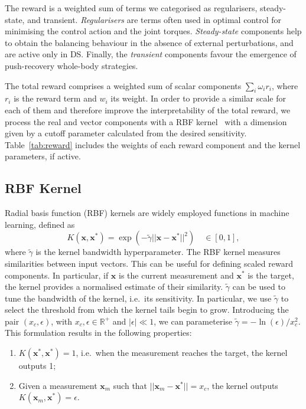 The reward is a weighted sum of terms we categorised as regularisers, steady-state, and transient.
\emph{Regularisers} are terms often used in optimal control for minimising the control action and the joint torques.
\emph{Steady-state} components help to obtain the balancing behaviour in the absence of external perturbations, and are active only in \ac{DS}.
Finally, the \emph{transient} components favour the emergence of push-recovery whole-body strategies.

The total reward comprises a weighted sum of scalar components $\sum_i \omega_i r_i$, where $r_i$ is the reward term and $w_i$ its weight.
In order to provide a similar scale for each of them and therefore improve the interpretability of the total reward, we process the real and vector components with a \ac{RBF} kernel~\parencite{yang_emergence_2017} with a dimension given by a cutoff parameter calculated from the desired sensitivity.
Table~\ref{tab:reward} includes the weights of each reward component and the kernel parameters, if active.

\subsection{RBF Kernel}

Radial basis function (RBF) kernels are widely employed functions in machine learning, defined as
$$
K(\mathbf{x}, \mathbf{x}^*) = \exp \left( -\tilde\gamma ||\mathbf{x} - \mathbf{x}^*||^2  \right) \quad \in [0, 1] ,
$$
where $\tilde\gamma$ is the kernel bandwidth hyperparameter.
The RBF kernel measures similarities between input vectors.
This can be useful for defining scaled reward components.
In particular, if $\mathbf{x}$ is the current measurement and $\mathbf{x}^*$ is the target, the kernel provides a normalised estimate of their similarity.
$\tilde\gamma$ can be used to tune the bandwidth of the kernel, i.e.\ its sensitivity.
In particular, we use $\tilde\gamma$ to select the threshold from which the kernel tails begin to grow.
Introducing the pair $(x_c, \epsilon)$, with $x_c, \epsilon \in \mathbb{R}^+$ and $|\epsilon| \ll 1$, we can parameterise $\tilde\gamma = -\ln(\epsilon) / x_c^2$.
This formulation results in the following properties:

\begin{enumerate}
    \item $K(\mathbf{x}^*, \mathbf{x}^*) = 1$, i.e.\ when the measurement reaches the target, the kernel outputs 1;
    \item Given a measurement $\mathbf{x}_m$ such that $||\mathbf{x}_m - \mathbf{x}^*|| = x_c$, the kernel outputs $K(\mathbf{x}_m, \mathbf{x}^*) = \epsilon$.
\end{enumerate}

